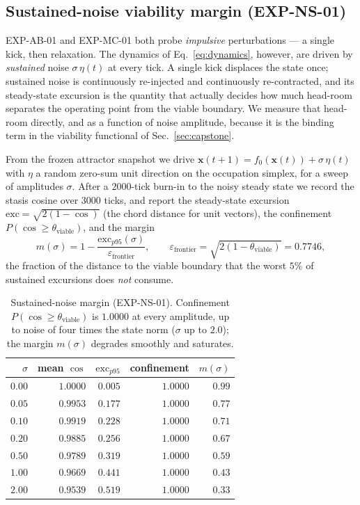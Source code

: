 \documentclass[11pt, a4paper]{article}
\newcommand{\sv}{\bm{x}}
\begin{document}
\subsection{Sustained-noise viability margin (EXP-NS-01)}
\label{sec:sustained_noise}

EXP-AB-01 and EXP-MC-01 both probe \emph{impulsive} perturbations --- a single
kick, then relaxation. The dynamics of Eq.~\eqref{eq:dynamics}, however, are
driven by \emph{sustained} noise $\sigma\,\eta(t)$ at every tick. A single kick
displaces the state once; sustained noise is continuously re-injected and
continuously re-contracted, and its steady-state excursion is the quantity that
actually decides how much head-room separates the operating point from the
viable boundary. We measure that head-room directly, and as a function of noise
amplitude, because it is the binding term in the viability functional of
Sec.~\ref{sec:capstone}.

From the frozen attractor snapshot we drive
$\sv(t{+}1) = f_0(\sv(t)) + \sigma\,\eta(t)$ with $\eta$ a random zero-sum
unit direction on the occupation simplex, for a sweep of amplitudes $\sigma$.
After a $2000$-tick burn-in to the noisy steady state we record the stasis
cosine over $3000$ ticks, and report the steady-state excursion
$\mathrm{exc} = \sqrt{2(1-\cos)}$ (the chord distance for unit vectors), the
confinement $P(\cos \ge \theta_\text{viable})$, and the margin
\begin{equation}
  m(\sigma) = 1 - \frac{\mathrm{exc}_{p95}(\sigma)}{\varepsilon_\text{frontier}},
  \qquad
  \varepsilon_\text{frontier} = \sqrt{2(1-\theta_\text{viable})} = 0.7746,
  \label{eq:margin}
\end{equation}
the fraction of the distance to the viable boundary that the worst $5\%$ of
sustained excursions does \emph{not} consume.

\begin{table}[!htb]
\centering
\small
\begin{tabular}{rrrrr}
\toprule
$\sigma$ & mean $\cos$ & $\mathrm{exc}_{p95}$ & confinement & $m(\sigma)$ \\
\midrule
$0.00$ & $1.0000$ & $0.005$ & $1.0000$ & $0.99$ \\
$0.05$ & $0.9953$ & $0.177$ & $1.0000$ & $0.77$ \\
$0.10$ & $0.9919$ & $0.228$ & $1.0000$ & $0.71$ \\
$0.20$ & $0.9885$ & $0.256$ & $1.0000$ & $0.67$ \\
$0.50$ & $0.9789$ & $0.319$ & $1.0000$ & $0.59$ \\
$1.00$ & $0.9669$ & $0.441$ & $1.0000$ & $0.43$ \\
$2.00$ & $0.9539$ & $0.519$ & $1.0000$ & $0.33$ \\
\bottomrule
\end{tabular}
\caption{Sustained-noise margin (EXP-NS-01). Confinement
$P(\cos \ge \theta_\text{viable})$ is $1.0000$ at every amplitude, up to noise
of four times the state norm ($\sigma$ up to $2.0$); the margin $m(\sigma)$
degrades smoothly and saturates.}
\label{tab:sustained_noise}
\end{table}
\end{document}
